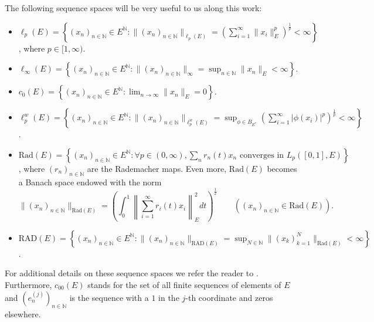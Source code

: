 \documentclass[12pt]{amsart}
\def\N{\mathbb{N}}
\def\Rad{\mathrm{Rad}}
\def\RAD{\mathrm{RAD}}
\begin{document}
The following sequence spaces will be very useful to us along this work:
\begin{itemize}
	\item $\ell_p(E) = \left\{ (x_n)_{n\in\N} \in E^\N: \|(x_n)_{n\in\N}\|_{\ell_p(E)} = \left(\sum_{i=1}^\infty \|x_i\|_E^p \right)^{\frac{1}{p}} < \infty \right\}$, where $p \in [1,\infty)$.
	\item $\ell_\infty(E) = \left\{ (x_n)_{n\in\N} \in E^\N: \|(x_n)_{n\in\N}\|_\infty = \sup_{n\in\N}\|x_n\|_E  < \infty \right\}$.
	\item $c_0(E) = \left\{ (x_n)_{n\in\N} \in E^\N: \lim_{n\to \infty} \|x_n\|_E =  0 \right\}$.
	\item $\ell_p^w(E) = \left\{ (x_n)_{n\in\N} \in E^\N: \|(x_n)_{n\in\N}\|_{\ell_p^w(E)} = \sup_{\phi \in B_{E^*}} \left(\sum_{i=1}^\infty |\phi(x_i)|^p \right)^{\frac{1}{p}} < \infty \right\}$.
	\item $\Rad(E) = \left\{ (x_n)_{n\in\N} \in E^\N: \forall p\in (0,\infty), \sum_n r_n(t)x_n \text{ converges in } L_p([0,1],E) \right\}$, where $(r_n)_{n\in\N}$ are the Rademacher maps. Even more, $\Rad(E)$ becomes a Banach space endowed with the norm
	$$
	\|(x_n)_{n\in\N}\|_{\Rad(E)} = \left( \int_{0}^{1}\left\| \sum_{i=1}^{\infty} r_i(t)x_i \right\|_E^2 dt \right)^{\frac{1}{2}} \qquad ((x_n)_{n\in\N}\in \Rad(E)).
	$$
	\item $\RAD(E) = \left\{ (x_n)_{n\in\N} \in E^\N: \|(x_n)_{n\in\N}\|_{\RAD(E)} = \sup_{N\in\N}\|(x_k)_{k=1}^N\|_{\Rad(E)} < \infty \right\}$.
\end{itemize}

For additional details on these sequence spaces we refer the reader to \cite{BlaBotPelRue-11, BlaFouSch-07, DieJarTon-95}. Furthermore, $c_{00}(E)$ stands for the set of all finite sequences of elements of $E$ and $(e_n^{(j)})_{n\in\N}$ is the sequence with a $1$ in the $j$-th coordinate and zeros elsewhere.
\end{document}

